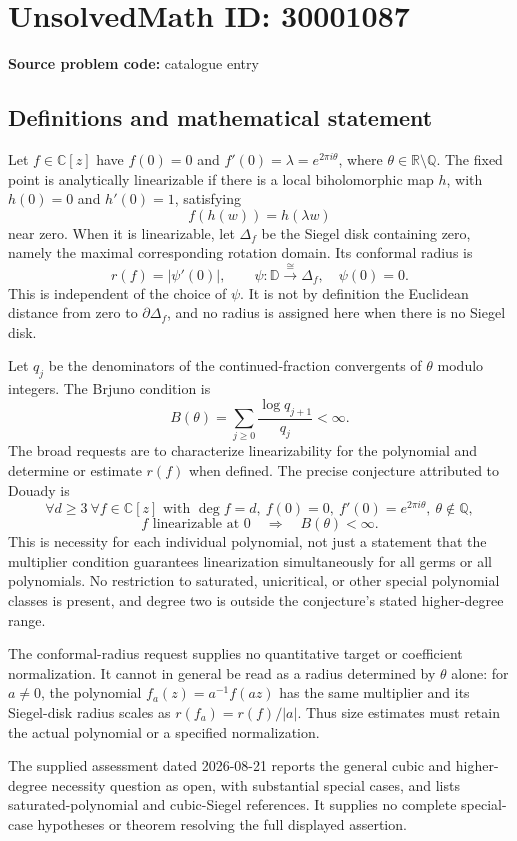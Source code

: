 \documentclass[11pt]{article}
\newcommand{\Q}{\mathbb{Q}}
\newcommand{\R}{\mathbb{R}}
\newcommand{\C}{\mathbb{C}}
\begin{document}
\section*{UnsolvedMath ID: 30001087}
\textbf{Source problem code:} catalogue entry
\subsection{Definitions and mathematical statement}
Let \(f\in\C[z]\) have \(f(0)=0\) and \(f'(0)=\lambda=e^{2\pi i\theta}\), where \(\theta\in\R\setminus\Q\). The fixed point is analytically linearizable if there is a local biholomorphic map \(h\), with \(h(0)=0\) and \(h'(0)=1\), satisfying
\[
 f(h(w))=h(\lambda w)
\]
near zero. When it is linearizable, let \(\Delta_f\) be the Siegel disk containing zero, namely the maximal corresponding rotation domain. Its conformal radius is
\[
 r(f)=|\psi'(0)|,
 \qquad\psi:\mathbb D\xrightarrow{\cong}\Delta_f,\quad\psi(0)=0.
\]
This is independent of the choice of \(\psi\). It is not by definition the Euclidean distance from zero to \(\partial\Delta_f\), and no radius is assigned here when there is no Siegel disk.

Let \(q_j\) be the denominators of the continued-fraction convergents of \(\theta\) modulo integers. The Brjuno condition is
\[
 B(\theta)=\sum_{j\geq0}\frac{\log q_{j+1}}{q_j}<\infty.
\]
The broad requests are to characterize linearizability for the polynomial and determine or estimate \(r(f)\) when defined. The precise conjecture attributed to Douady is
\[
 \forall d\geq3\ \forall f\in\C[z]\text{ with }\deg f=d,\ f(0)=0,
 \ f'(0)=e^{2\pi i\theta},\ \theta\notin\Q,
\]
\[
 f\text{ linearizable at }0\quad\Longrightarrow\quad B(\theta)<\infty.
\]
This is necessity for each individual polynomial, not just a statement that the multiplier condition guarantees linearization simultaneously for all germs or all polynomials. No restriction to saturated, unicritical, or other special polynomial classes is present, and degree two is outside the conjecture's stated higher-degree range.

The conformal-radius request supplies no quantitative target or coefficient normalization. It cannot in general be read as a radius determined by \(\theta\) alone: for \(a\ne0\), the polynomial \(f_a(z)=a^{-1}f(az)\) has the same multiplier and its Siegel-disk radius scales as \(r(f_a)=r(f)/|a|\). Thus size estimates must retain the actual polynomial or a specified normalization.

The supplied assessment dated 2026-08-21 reports the general cubic and higher-degree necessity question as open, with substantial special cases, and lists saturated-polynomial and cubic-Siegel references. It supplies no complete special-case hypotheses or theorem resolving the full displayed assertion.
\end{document}
